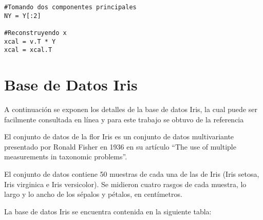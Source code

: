 \begin{appendices}
\begin{lstlisting}[frame=single]
#Tomando dos componentes principales
NY = Y[:2]

#Reconstruyendo x
xcal = v.T * Y
xcal = xcal.T

\end{lstlisting}

\newpage

\section{Base de Datos Iris}\label{Iris}

A continuación se exponen los detalles de la base de datos Iris, la cual puede ser facilmente consultada en línea y para este trabajo se obtuvo de la referencia \cite{iris}

El conjunto de datos de la flor Iris es un conjunto de datos multivariante presentado por Ronald Fisher en 1936 en su artículo ``The use of multiple measurements in taxonomic problems''. 

El conjunto de datos contiene 50 muestras de cada una de las de Iris (Iris setosa, Iris virginica e Iris versicolor). Se midieron cuatro rasgos de cada muestra, lo largo y lo ancho de los sépalos y pétalos, en centímetros. 

La base de datos Iris se encuentra contenida en la siguiente tabla:


\end{appendices}
